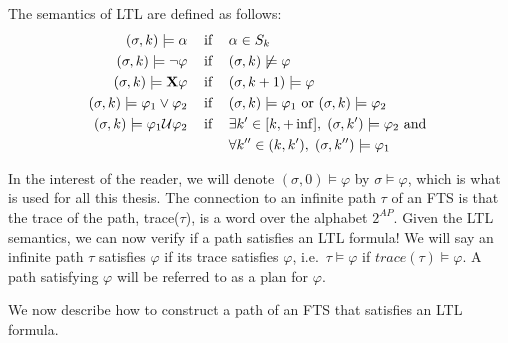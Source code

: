 \theoremstyle{definition}
\begin{definition}
\label{defLTLS}
The semantics of LTL are defined as follows:
\begin{align*}
(\sigma,k) \models \alpha \hspace{0.3cm}\text{ if }\hspace{0.3cm}& \alpha \in S_k \\
(\sigma,k) \models \neg \varphi \hspace{0.3cm}\text{ if }\hspace{0.3cm}& (\sigma, k) \not \models \varphi \\
(\sigma,k) \models \textbf{X} \varphi \hspace{0.3cm}\text{ if }\hspace{0.3cm}& (\sigma, k+1) \models \varphi \\
(\sigma,k) \models \varphi_1 \lor \varphi_2 \hspace{0.3cm}\text{ if }\hspace{0.3cm}& (\sigma,k) \models \varphi_1 \text{ or } (\sigma,k) \models \varphi_2 \\
(\sigma,k) \models \varphi_1 \mathcal{U} \varphi_2 \hspace{0.3cm}\text{ if }\hspace{0.3cm}& \exists k' \in [k,+\inf ], \hspace{0.1cm} (\sigma ,k') \models \varphi_2 \text{ and } \\ &\forall k'' \in (k,k'), \hspace{0.1cm} (\sigma, k'') \models \varphi_1 
\end{align*}
\end{definition}
In the interest of the reader, we will denote $(\sigma ,0) \models \varphi$ by $\sigma \models \varphi$, which is what is used for all this thesis. The connection to an infinite path $\tau$ of an FTS is that the trace of the path, trace($\tau$), is a word over the alphabet $2^{AP}$. Given the LTL semantics, we can now verify if a path satisfies an LTL formula! We will say an infinite path $\tau$ satisfies $\varphi$ if its trace satisfies $\varphi$, i.e.\ $\tau \models \varphi$ if $trace(\tau) \models \varphi$. A path satisfying $\varphi$ will be referred to as a plan for $\varphi$.



We now describe how to construct a path of an FTS that satisfies an LTL formula. 

 

